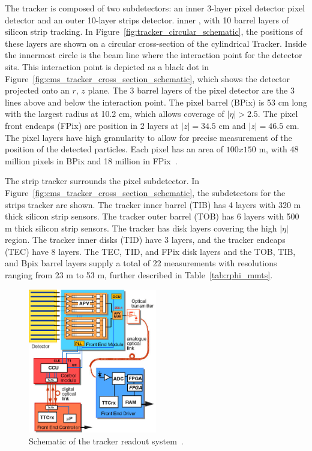 The tracker is composed of two subdetectors: an inner 3-layer pixel detector pixel detector and an outer 10-layer strips detector. inner , with 10 barrel layers of silicon strip tracking. In Figure~\ref{fig:tracker_circular_schematic}, the positions of these layers are shown on a circular cross-section of the cylindrical Tracker. Inside the innermost circle is the beam line where the interaction point for the detector sits. This interaction point is depicted as a black dot in Figure~\ref{fig:cms_tracker_cross_section_schematic}, which shows the detector projected onto an $r$, $z$ plane.  The 3 barrel layers of the pixel detector are the 3 lines above and below the interaction point. The pixel barrel (BPix) is 53 cm long with the largest radius at 10.2 cm, which allows coverage of $|\eta| > 2.5$. The pixel front endcaps (FPix) are position in 2 layers at $|z| = 34.5$ cm and $|z| = 46.5$ cm. The pixel layers have high granularity to allow for precise measurement of the position of the detected particles. Each pixel has an area of $100x150$ \textmu m, with 48 million pixels in BPix and 18 million in FPix~\cite{CMSExperiment}.

The strip tracker surrounds the pixel subdetector. In Figure~\ref{fig:cms_tracker_cross_section_schematic}, the subdetectors for the strips tracker are shown. The tracker inner barrel (TIB) has 4 layers with 320 \textmu m thick silicon strip sensors. The tracker outer barrel (TOB) has 6 layers with 500 \textmu m thick silicon strip sensors. The tracker has disk layers covering the high $|\eta|$ region. The tracker inner disks (TID) have 3 layers, and the tracker endcaps (TEC) have 8 layers. The TEC, TID, and FPix disk layers and the TOB, TIB, and Bpix barrel layers supply a total of 22 measurements with resolutions ranging from 23 \textmu m to 53 \textmu m, further described in Table~\ref{tab:rphi_mmts}.

\begin{figure}[h]
\centering
\includegraphics[width=0.5\textwidth]{figures/Read-out-scheme-of-the-CMS-Tracker.png}
\caption{Schematic of the tracker readout system~\cite{CMSExperiment}.} \label{fig:tracker_readout}
\end{figure}

